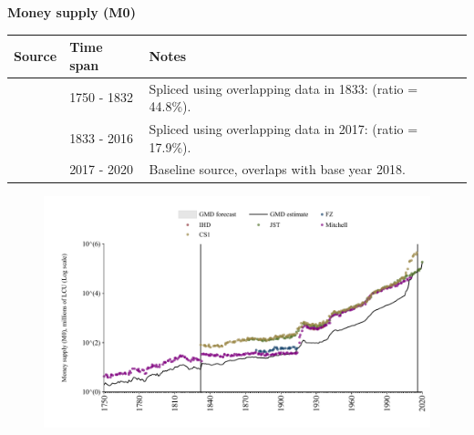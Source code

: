 \documentclass[12pt,a4paper,landscape]{article}
\begin{document}
\begin{adjustbox}{max totalsize={\paperwidth}{\paperheight},center}
\begin{minipage}[t][\textheight][t]{\textwidth}
\vspace*{0.5cm}
{}
\begin{center}
{\Large\bfseries Money supply (M0)}
\end{center}
\vspace{0.5cm}
\begin{table}[H]
\centering
\small
\begin{tabular}{|l|l|l|}
\hline
\textbf{Source} & \textbf{Time span} & \textbf{Notes} \\
\hline
\rowcolor{white}\cite{Mitchell}& 1750 - 1832 &Spliced using overlapping data in 1833: (ratio = 44.8\%). \\
\rowcolor{lightgray}\cite{CS1_GBR}& 1833 - 2016 &Spliced using overlapping data in 2017: (ratio = 17.9\%). \\
\rowcolor{white}\cite{JST}& 2017 - 2020 &Baseline source, overlaps with base year 2018. \\
\hline
\end{tabular}
\end{table}
\begin{figure}[H]
\centering
\includegraphics[width=\textwidth,height=0.6\textheight,keepaspectratio]{graphs/GBR_M0.pdf}
\end{figure}
\end{minipage}
\end{adjustbox}
\end{document}
